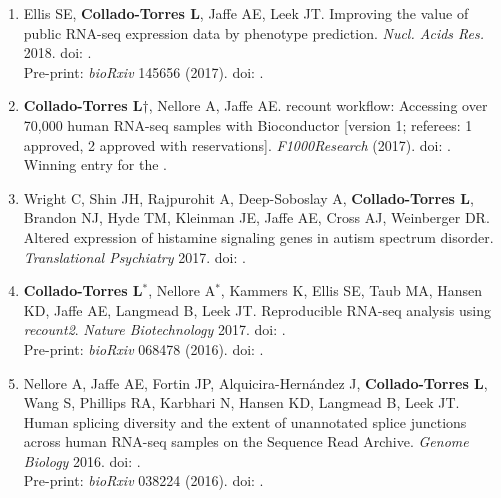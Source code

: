 \begin{enumerate}
        \item Ellis SE, \textbf{Collado-Torres L}, Jaffe AE, Leek JT. Improving the value of public RNA-seq expression data by phenotype prediction. \emph{Nucl. Acids Res.} 2018. doi: .
        \\ Pre-print: \emph{bioRxiv} 145656 (2017). doi: .
        
        \item \textbf{Collado-Torres L}$\dagger$, Nellore A, Jaffe AE. 
        recount workflow: Accessing over 70,000 human RNA-seq samples with Bioconductor [version 1; referees: 1 approved, 2 approved with reservations]. \emph{F1000Research} (2017). doi: .
        \\ Winning entry for the .
        
        \item Wright C, Shin JH, Rajpurohit A, Deep-Soboslay A, \textbf{Collado-Torres L}, Brandon NJ, Hyde TM, Kleinman JE, Jaffe AE, Cross AJ, Weinberger DR. Altered expression of histamine signaling genes in autism spectrum disorder. \emph{Translational Psychiatry} 2017. doi: .
        
        \item \textbf{Collado-Torres L}$^{*}$, Nellore A$^{*}$, Kammers K, Ellis SE, Taub MA, Hansen KD, Jaffe AE, Langmead B, Leek JT. Reproducible RNA-seq analysis using \emph{recount2}. \emph{Nature Biotechnology} 2017. doi: .
        \\ Pre-print: \emph{bioRxiv} 068478 (2016). doi: .
        
        \item Nellore A, Jaffe AE, Fortin JP, Alquicira-Hernández J, \textbf{Collado-Torres L}, Wang S, Phillips RA, Karbhari N, Hansen KD, Langmead B, Leek JT. Human splicing diversity and the extent of unannotated splice junctions across human RNA-seq samples on the Sequence Read Archive. \emph{Genome Biology} 2016. doi: .
        \\ Pre-print: \emph{bioRxiv} 038224 (2016). doi: .
        

\end{enumerate}
